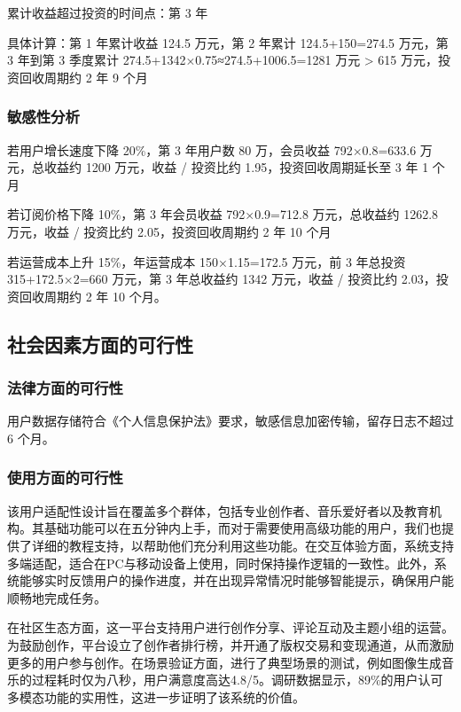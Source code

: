 \documentclass{base}
\numberwithin{figure}{section} %
\begin{document}
累计收益超过投资的时间点：第 3 年

具体计算：第 1 年累计收益 124.5 万元，第 2 年累计 124.5+150=274.5 万元，第 3 年到第 3 季度累计 274.5+1342×0.75≈274.5+1006.5=1281 万元 > 615 万元，投资回收周期约 2 年 9 个月

\subsubsection{敏感性分析}


若用户增长速度下降 20\%，第 3 年用户数 80 万，会员收益 792×0.8=633.6 万元，总收益约 1200 万元，收益 / 投资比约 1.95，投资回收周期延长至 3 年 1 个月

若订阅价格下降 10\%，第 3 年会员收益 792×0.9=712.8 万元，总收益约 1262.8 万元，收益 / 投资比约 2.05，投资回收周期约 2 年 10 个月

若运营成本上升 15\%，年运营成本 150×1.15=172.5 万元，前 3 年总投资 315+172.5×2=660 万元，第 3 年总收益约 1342 万元，收益 / 投资比约 2.03，投资回收周期约 2 年 10 个月。

\subsection{社会因素方面的可行性}

\subsubsection{法律方面的可行性}

用户数据存储符合《个人信息保护法》要求，敏感信息加密传输，留存日志不超过 6 个月。

\subsubsection{使用方面的可行性}

该用户适配性设计旨在覆盖多个群体，包括专业创作者、音乐爱好者以及教育机构。其基础功能可以在五分钟内上手，而对于需要使用高级功能的用户，我们也提供了详细的教程支持，以帮助他们充分利用这些功能。在交互体验方面，系统支持多端适配，适合在PC与移动设备上使用，同时保持操作逻辑的一致性。此外，系统能够实时反馈用户的操作进度，并在出现异常情况时能够智能提示，确保用户能顺畅地完成任务。

在社区生态方面，这一平台支持用户进行创作分享、评论互动及主题小组的运营。为鼓励创作，平台设立了创作者排行榜，并开通了版权交易和变现通道，从而激励更多的用户参与创作。在场景验证方面，进行了典型场景的测试，例如图像生成音乐的过程耗时仅为八秒，用户满意度高达4.8/5。调研数据显示，89\%的用户认可多模态功能的实用性，这进一步证明了该系统的价值。
\end{document}
